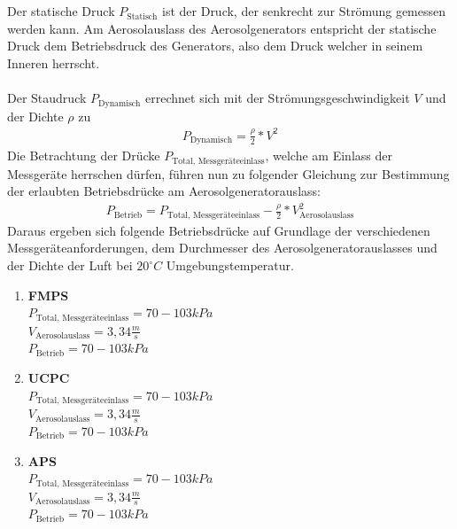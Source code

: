 \\\\
Der statische Druck \(P_\text{Statisch}\) ist der Druck, der senkrecht zur Str\"{o}mung gemessen werden kann. Am Aerosolauslass des Aerosolgenerators entspricht der statische Druck dem Betriebsdruck des Generators, also dem Druck welcher in seinem Inneren herrscht.
\\\\
Der Staudruck \(P_\text{Dynamisch}\) errechnet sich mit der Str\"{o}mungsgeschwindigkeit \(V\) und der Dichte \(\rho\) zu
\begin{align*}
	P_\text{Dynamisch} = \frac{\rho}{2} * V^2
\end{align*}
Die Betrachtung der Dr\"{u}cke \(P_\text{Total, Messger\"{a}teeinlass}\), welche am Einlass der Messger\"{a}te herrschen d\"{u}rfen, f\"{u}hren nun zu folgender Gleichung zur Bestimmung der erlaubten Betriebsdr\"{u}cke am Aerosolgeneratorauslass:
\begin{align*}
	P_\text{Betrieb} = P_\text{Total, Messger\"{a}teeinlass} - \frac{\rho}{2} * V_			\text{Aerosolauslass}^2
\end{align*}
Daraus ergeben sich folgende Betriebsdr\"{u}cke auf Grundlage der verschiedenen Messger\"{a}teanforderungen, dem Durchmesser des Aerosolgeneratorauslasses und der Dichte der Luft bei \(20^\circ C\) Umgebungstemperatur\cite{fmps_3091}\cite{ops_3330}\cite{ucpc_3776}\cite{aps_3321}\cite{topas}.
\begin{enumerate}
	\item \textbf{FMPS}\\
	\(P_\text{Total, Messger\"{a}teeinlass} = 70 - 103 kPa\)\\
	\(V_\text{Aerosolauslass} = 3,34 \frac{m}{s}\)\\
	\(P_\text{Betrieb} = 70 - 103 kPa\)\\
	\item \textbf{UCPC}\\
	\(P_\text{Total, Messger\"{a}teeinlass} = 70 - 103 kPa\)\\
	\(V_\text{Aerosolauslass} = 3,34 \frac{m}{s}\)\\
	\(P_\text{Betrieb} = 70 - 103 kPa\)\\
	\item \textbf{APS}\\
	\(P_\text{Total, Messger\"{a}teeinlass} = 70 - 103 kPa\)\\
	\(V_\text{Aerosolauslass} = 3,34 \frac{m}{s}\)\\
	\(P_\text{Betrieb} = 70 - 103 kPa\)
\end{enumerate} 

